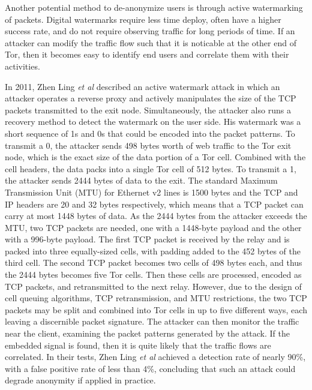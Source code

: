 \documentclass[journal]{IEEEtran}
\begin{document}
Another potential method to de-anonymize users is through active watermarking of packets. Digital watermarks require less time deploy, often have a higher success rate, and do not require observing traffic for long periods of time. If an attacker can modify the traffic flow such that it is noticable at the other end of Tor, then it becomes easy to identify end users and correlate them with their activities.

In 2011, Zhen Ling \textit{et al} described an active watermark attack in which an attacker operates a reverse proxy and actively manipulates the size of the TCP packets transmitted to the exit node. Simultaneously, the attacker also runs a recovery method to detect the watermark on the user side. His watermark was a short sequence of 1s and 0s that could be encoded into the packet patterns. To transmit a 0, the attacker sends 498 bytes worth of web traffic to the Tor exit node, which is the exact size of the data portion of a Tor cell. Combined with the cell headers, the data packs into a single Tor cell of 512 bytes. To transmit a 1, the attacker sends 2444 bytes of data to the exit. The standard Maximum Transmission Unit (MTU) for Ethernet v2 lines is 1500 bytes and the TCP and IP headers are 20 and 32 bytes respectively, which means that a TCP packet can carry at most 1448 bytes of data. As the 2444 bytes from the attacker exceeds the MTU, two TCP packets are needed, one with a 1448-byte payload and the other with a 996-byte payload. The first TCP packet is received by the relay and is packed into three equally-sized cells, with padding added to the 452 bytes of the third cell. The second TCP packet becomes two cells of 498 bytes each, and thus the 2444 bytes becomes five Tor cells. Then these cells are processed, encoded as TCP packets, and retransmitted to the next relay. However, due to the design of cell queuing algorithms, TCP retransmission, and MTU restrictions, the two TCP packets may be split and combined into Tor cells in up to five different ways, each leaving a discernible packet signature. The attacker can then monitor the traffic near the client, examining the packet patterns generated by the attack. If the embedded signal is found, then it is quite likely that the traffic flows are correlated. In their tests, Zhen Ling \textit{et al} achieved a detection rate of nearly 90\%, with a false positive rate of less than 4\%, concluding that such an attack could degrade anonymity if applied in practice.\cite{Ling2011}
\end{document}

